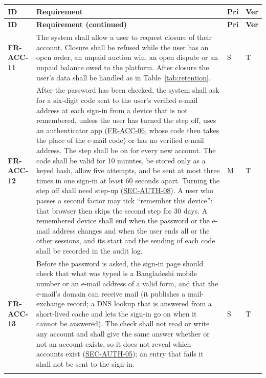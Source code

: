 \documentclass[11pt,a4paper]{report}
\makeatletter
\newenvironment{reqs}{%
  \small
  \begin{longtable}{@{}>{\raggedright\arraybackslash}p{2.35cm}
                       >{\raggedright\arraybackslash}p{10.3cm}
                       >{\centering\arraybackslash}p{0.7cm}
                       >{\centering\arraybackslash}p{0.7cm}@{}}
  \toprule
  \textbf{ID} & \textbf{Requirement} & \textbf{Pri} & \textbf{Ver} \\
  \midrule
  \endfirsthead
  \toprule
  \textbf{ID} & \textbf{Requirement (continued)} & \textbf{Pri} & \textbf{Ver} \\
  \midrule
  \endhead
  \bottomrule
  \endfoot
}{\end{longtable}}
\newcommand{\req}[5]{\leavevmode\textbf{#1}\hypertarget{#1}{} & #5 & #2 & #3 \\ \addlinespace[2pt]}
\newcommand{\rr}[1]{\hyperlink{#1}{#1}}
\makeatother
\begin{document}
\begin{reqs}
\req{FR-ACC-11}{S}{T}{new}{The system shall allow a user to request closure of their account. Closure shall be refused while the user has an open order, an unpaid auction win, an open dispute or an unpaid balance owed to the platform. After closure the user's data shall be handled as in Table~\ref{tab:retention}.}
\req{FR-ACC-12}{M}{T}{new}{After the password has been checked, the system shall ask for a six-digit code sent to the user's verified e-mail address at each sign-in from a device that is not remembered, unless the user has turned the step off, uses an authenticator app (\rr{FR-ACC-06}, whose code then takes the place of the e-mail code) or has no verified e-mail address. The step shall be on for every new account. The code shall be valid for 10 minutes, be stored only as a keyed hash, allow five attempts, and be sent at most three times in one sign-in at least 60 seconds apart. Turning the step off shall need step-up (\rr{SEC-AUTH-08}). A user who passes a second factor may tick ``remember this device'': that browser then skips the second step for 30 days. A remembered device shall end when the password or the e-mail address changes and when the user ends all or the other sessions, and its start and the sending of each code shall be recorded in the audit log.}
\req{FR-ACC-13}{S}{T}{new}{Before the password is asked, the sign-in page should check that what was typed is a Bangladeshi mobile number or an e-mail address of a valid form, and that the e-mail's domain can receive mail (it publishes a mail-exchange record; a DNS lookup that is answered from a short-lived cache and lets the sign-in go on when it cannot be answered). The check shall not read or write any account and shall give the same answer whether or not an account exists, so it does not reveal which accounts exist (\rr{SEC-AUTH-05}); an entry that fails it shall not be sent to the sign-in.}
\end{reqs}
\end{document}
